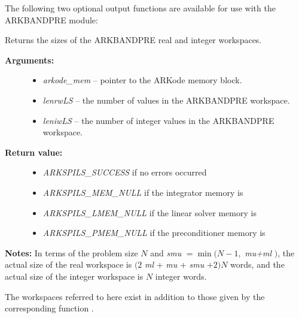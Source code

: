 \documentclass[letterpaper,10pt,english]{sphinxmanual}
\begin{document}
The following two optional output functions are available for use with
the ARKBANDPRE module:

\begin{fulllineitems}
\label{c_interface/Preconditioners:ARKBandPrecGetWorkSpace}
Returns the sizes of the ARKBANDPRE real and integer
workspaces.
\begin{description}
\item[{\textbf{Arguments:}}] \leavevmode\begin{itemize}
\item {} 
\emph{arkode\_mem} -- pointer to the ARKode memory block.

\item {} 
\emph{lenrwLS} -- the number of  values in the
ARKBANDPRE workspace.

\item {} 
\emph{leniwLS} -- the number of integer values in the  ARKBANDPRE workspace.

\end{itemize}

\item[{\textbf{Return value:}}] \leavevmode\begin{itemize}
\item {} 
\emph{ARKSPILS\_SUCCESS} if no errors occurred

\item {} 
\emph{ARKSPILS\_MEM\_NULL} if the integrator memory is 

\item {} 
\emph{ARKSPILS\_LMEM\_NULL} if the linear solver memory is 

\item {} 
\emph{ARKSPILS\_PMEM\_NULL} if the preconditioner memory is 

\end{itemize}

\end{description}

\textbf{Notes:} In terms of the problem size $N$ and \emph{smu} $=
\min(N-1,$ \emph{mu+ml} $)$, the actual size of the real
workspace is $(2$ \emph{ml} + \emph{mu} + \emph{smu} $+2)N$ 
words, and the actual size of the integer workspace is $N$
integer words.

The workspaces referred to here exist in addition to those given by
the corresponding function .

\end{fulllineitems}
\end{document}
